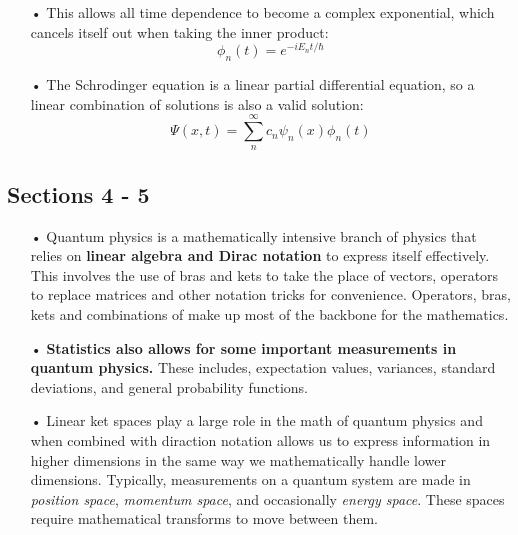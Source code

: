 \documentclass[12pt,letterpaper]{book}
\begin{document}
\begin{enumerate}
\begin{equation}
\end{equation}
\item[•]This allows all time dependence to become a complex exponential, which cancels itself out when taking the inner product:
\begin{equation}
\phi_n(t) = e^{-iE_nt/\hbar}
\end{equation}
\item[•]The Schrodinger equation is a linear partial differential equation, so a linear combination of solutions is also a valid solution:
\begin{equation}
\Psi(x,t) = \sum_n^{\infty} c_n \psi_n(x) \phi_n(t)
\end{equation}
\end{enumerate}


\subsection*{Sections 4 - 5}
\begin{enumerate}
\item[•]Quantum physics is a mathematically intensive branch of physics that relies on \textbf{linear algebra and Dirac notation} to express itself effectively. This involves the use of bras and kets to take the place of vectors, operators to replace matrices and other notation tricks for convenience. Operators, bras, kets and combinations of make up most of the backbone for the mathematics.
\item[•]\textbf{Statistics also allows for some important measurements in quantum physics.} These includes, expectation values, variances, standard deviations, and general probability functions.
\item[•]Linear ket spaces play a large role in the math of quantum physics and when combined with diraction notation allows us to express information in higher dimensions in the same way we mathematically handle lower dimensions. Typically, measurements on a quantum system are made in \textit{position space}, \textit{momentum space}, and occasionally \textit{energy space}. These spaces require mathematical transforms to move between them.
\end{enumerate}

\end{document}
